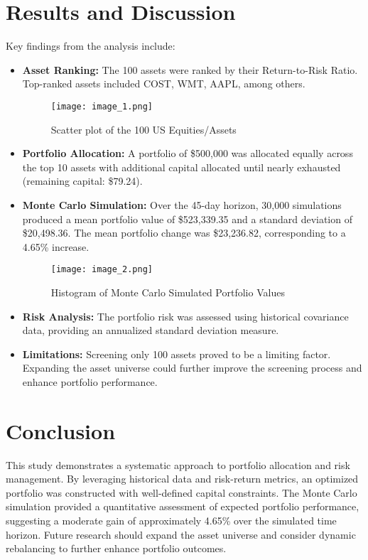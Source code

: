 \documentclass[11pt]{article}
\begin{document}
\section{Results and Discussion}
Key findings from the analysis include:
\begin{itemize}
    \item \textbf{Asset Ranking:} The 100 assets were ranked by their Return-to-Risk Ratio. Top-ranked assets included COST, WMT, AAPL, among others.
    \begin{figure}[H]
    \centering
    \texttt{[image: image\_1.png]}
    \caption{Scatter plot of the 100 US Equities/Assets }
    \label{fig:scatter plot}
\end{figure}

    \item \textbf{Portfolio Allocation:} A portfolio of \$500,000 was allocated equally across the top 10 assets with additional capital allocated until nearly exhausted (remaining capital: \$79.24).
    \item \textbf{Monte Carlo Simulation:} Over the 45-day horizon, 30,000 simulations produced a mean portfolio value of \$523,339.35 and a standard deviation of \$20,498.36. The mean portfolio change was \$23,236.82, corresponding to a 4.65\% increase.
    \begin{figure}[H]
    \centering
    \texttt{[image: image\_2.png]}
    \caption{Histogram of Monte Carlo Simulated Portfolio Values}
    \label{fig:monte_carlo}
\end{figure}

    \item \textbf{Risk Analysis:} The portfolio risk was assessed using historical covariance data, providing an annualized standard deviation measure.
    \item \textbf{Limitations:} Screening only 100 assets proved to be a limiting factor. Expanding the asset universe could further improve the screening process and enhance portfolio performance.
\end{itemize}

\section{Conclusion}
This study demonstrates a systematic approach to portfolio allocation and risk management. By leveraging historical data and risk-return metrics, an optimized portfolio was constructed with well-defined capital constraints. The Monte Carlo simulation provided a quantitative assessment of expected portfolio performance, suggesting a moderate gain of approximately 4.65\% over the simulated time horizon. Future research should expand the asset universe and consider dynamic rebalancing to further enhance portfolio outcomes.
\end{document}
